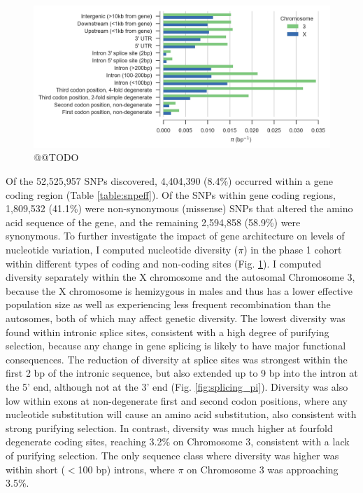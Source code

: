 \documentclass[a4paper,11pt,abstracton,hidelinks]{scrartcl}
\begin{document}
\begin{figure}[t!]
\centering
\includegraphics[width=1.1\textwidth,center]{artwork/chapter3/feature_pi.jpeg}
\caption{@@TODO
}
%
\label{fig:feature_pi}
\end{figure}



%
Of the 52,525,957 SNPs discovered, 4,404,390 (8.4\%) occurred within a gene coding region (Table \ref{table:snpeff}).
%
Of the SNPs within gene coding regions, 1,809,532 (41.1\%) were non-synonymous (missense) SNPs that altered the amino acid sequence of the gene, and the remaining 2,594,858 (58.9\%) were synonymous.
%
To further investigate the impact of gene architecture on levels of nucleotide variation, I computed nucleotide diversity ($\pi$) in the phase 1 cohort within different types of coding and non-coding sites (Fig. \ref{fig:feature_pi}).
%
I computed diversity separately within the X chromosome and the autosomal Chromosome 3, because the X chromosome is hemizygous in males and thus has a lower effective population size as well as experiencing less frequent recombination than the autosomes, both of which may affect genetic diversity.
%
The lowest diversity was found within intronic splice sites, consistent with a high degree of purifying selection, because any change in gene splicing is likely to have major functional consequences.
%
The reduction of diversity at splice sites was strongest within the first 2 bp of the intronic sequence, but also extended up to 9 bp into the intron at the 5' end, although not at the 3' end (Fig. \ref{fig:splicing_pi}). 
%
Diversity was also low within exons at non-degenerate first and second codon positions, where any nucleotide substitution will cause an amino acid substitution, also consistent with strong purifying selection.
%
In contrast, diversity was much higher at fourfold degenerate coding sites, reaching 3.2\% on Chromosome 3, consistent with a lack of purifying selection.
%
The only sequence class where diversity was higher was within short ($<$100 bp) introns, where $\pi$ on Chromosome 3 was approaching 3.5\%.
\end{document}
